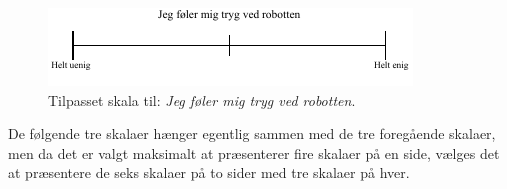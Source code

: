 %
\begin{figure}[H]
\centering
\includegraphics[width =\textwidth]{Figure/TilpasningAfSkalaer/TilpassetTrygVedR} 
\caption{Tilpasset skala til: \textit{Jeg føler mig tryg ved robotten}.}
\label{fig:TilpasningTrygVedR}
\end{figure}
\noindent
%
De følgende tre skalaer hænger egentlig sammen med de tre foregående skalaer, men da det er valgt maksimalt at præsenterer fire skalaer på en side, vælges det at præsentere de seks skalaer på to sider med tre skalaer på hver. 

